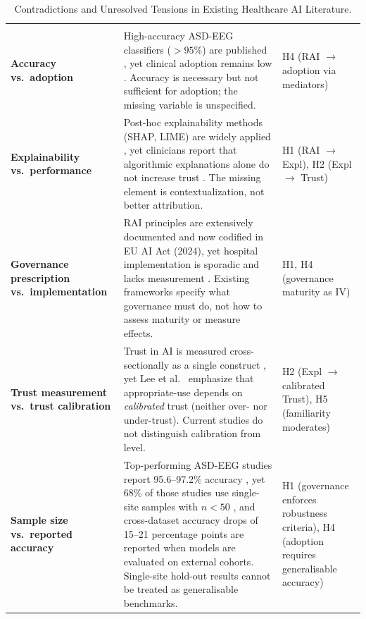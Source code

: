 {\tablestripes\tablefontsize
\begin{xltabular}{\textwidth}{@{} >{\raggedright\arraybackslash}p{3.6cm} L >{\raggedright\arraybackslash}p{2.6cm} @{}}
\caption[Contradictions in Existing Healthcare AI Literature]{Contradictions and Unresolved Tensions in Existing Healthcare AI Literature.}\label{tab:lit_contradictions} \\
\toprule
{} &  &  \\
\midrule
\endfirsthead
\toprule
{} &  &  \\
\midrule
\endhead
\bottomrule
\endlastfoot
\textbf{Accuracy vs.\ adoption} & High-accuracy ASD-EEG classifiers ($>95$\%) are published \cite{bosl2018eeg, ari2022asd}, yet clinical adoption remains low \cite{kelly2019healthcare}. Accuracy is necessary but not sufficient for adoption; the missing variable is unspecified. & H4 (RAI $\to$ adoption via mediators) \\
\textbf{Explainability vs.\ performance} & Post-hoc explainability methods (SHAP, LIME) are widely applied \cite{arrieta2020xai}, yet clinicians report that algorithmic explanations alone do not increase trust \cite{holzinger2022xai}. The missing element is contextualization, not better attribution. & H1 (RAI $\to$ Expl), H2 (Expl $\to$ Trust) \\
\textbf{Governance prescription vs.\ implementation} & RAI principles are extensively documented \cite{floridi2018ai4people} and now codified in EU AI Act (2024), yet hospital implementation is sporadic and lacks measurement \cite{kelly2019healthcare}. Existing frameworks specify what governance must do, not how to assess maturity or measure effects. & H1, H4 (governance maturity as IV) \\
\textbf{Trust measurement vs.\ trust calibration} & Trust in AI is measured cross-sectionally as a single construct \cite{madsen2000measuring}, yet Lee et al.~\cite{lee2004trust} emphasize that appropriate-use depends on \emph{calibrated} trust (neither over- nor under-trust). Current studies do not distinguish calibration from level. & H2 (Expl $\to$ calibrated Trust), H5 (familiarity moderates) \\
\textbf{Sample size vs.\ reported accuracy} & Top-performing ASD-EEG studies report 95.6--97.2\% accuracy \cite{ari2022asd, sinha2022asd, esqueda2022asd_eeg}, yet 68\% of those studies use single-site samples with $n < 50$ \cite{kelly2019healthcare}, and cross-dataset accuracy drops of 15--21 percentage points are reported when models are evaluated on external cohorts. Single-site hold-out results cannot be treated as generalisable benchmarks. & H1 (governance enforces robustness criteria), H4 (adoption requires generalisable accuracy) \\

\end{xltabular}}

